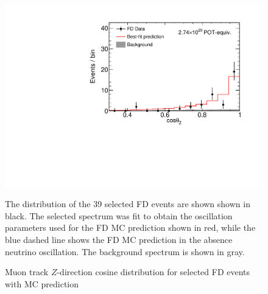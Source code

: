 \begin{figure}
\begin{center}
\includegraphics[width=\textwidth]{figures/results/fd_data_mc_numi_plots/dirZ_unblind.pdf}
\end{center}
\caption{  Muon track $Z$-direction cosine distribution for selected FD events with MC prediction }{
The distribution of the 39 selected FD events are shown shown in black.
The selected spectrum was fit to obtain the oscillation parameters used
for the FD MC prediction shown in red, while
the blue dashed line shows the FD MC prediction in the absence neutrino
oscillation.
The background spectrum is shown in gray.
}
\label{dirZ_unblind}

\end{figure}



